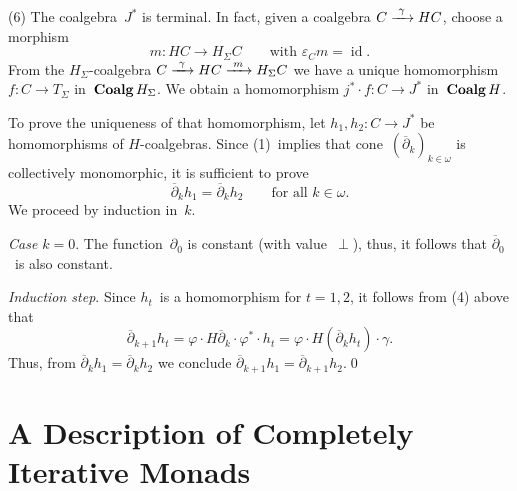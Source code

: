 \documentclass{entcs}
\DeclareMathOperator{\id}{id}
\DeclareMathOperator{\Coalg}{\textnormal{\textbf{Coalg}}}
\begin{document}
\begin{pf}
(6) The coalgebra~$J^*$ is terminal. In fact, given a coalgebra
$C\xrightarrow{\rule{1mm}{0mm}\gamma\rule{1mm}{0mm}}HC$, choose a
morphism
\[m\colon HC\to H_\Sigma C\qquad\text{with $\varepsilon_Cm=\id$.}\]
From the $H_\Sigma$-coalgebra
$C\xrightarrow{\rule{1mm}{0mm}\gamma\rule{1mm}{0mm}}
HC\xrightarrow{\rule{1mm}{0mm}m\rule{1mm}{0mm}}H_\Sigma C$ we have a
unique homomorphism $f\colon C\to T_\Sigma$ in~$\Coalg H_\Sigma$. We
obtain a homomorphism $j^*{\cdot}f\colon C\to J^*$ in~$\Coalg H$.

To prove the uniqueness of that homomorphism, let $h_1,h_2\colon
C\to J^*$ be homomorphisms of $H$-coalgebras. Since (1)~implies that
cone~$(\overline{\partial}_k)_{k\in\omega}$ is collectively
monomorphic, it is sufficient to prove
\[\overline{\partial}_kh_1=\overline{\partial}_kh_2\qquad
\text{for all $k\in\omega$.}\]
We proceed by induction in~$k$.

\textit{Case $k=0$}. The function~$\partial_0$ is constant (with
value~$\perp$), thus, it follows that $\overline{\partial}_0$~is
also constant.

\textit{Induction step}. Since $h_t$~is a homomorphism for $t=1,2$,
it follows from (4) above that
\[\overline{\partial}_{k+1}h_t=\varphi{\cdot}H \overline{\partial}_k
{\cdot}\varphi^*{\cdot}h_t=\varphi
{\cdot}H(\overline{\partial}_kh_t){\cdot}\gamma.\]
Thus, from $\overline{\partial}_kh_1=\overline{\partial}_kh_2$
we conclude
$\overline{\partial}_{k+1}h_1=\overline{\partial}_{k+1}h_2$.\qed
\end{pf}

\section{A Description of Completely Iterative Monads}
\end{document}
